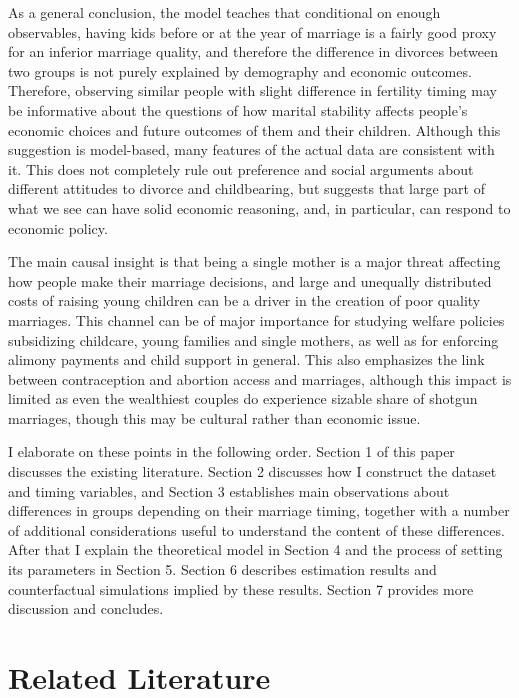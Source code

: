 \documentclass[12pt,letter]{article}
\begin{document}
As a general conclusion, the model teaches that conditional on enough observables, having kids before or at the year of marriage is a fairly good proxy for an inferior marriage quality, and therefore the difference in divorces between two groups is not purely explained by demography and economic outcomes. Therefore, observing similar people with slight difference in fertility timing may be informative about the questions of how marital stability affects people's economic choices and future outcomes of them and their children. Although this suggestion is model-based, many features of the actual data are consistent with it. This does not completely rule out preference and social arguments about different attitudes to divorce and childbearing, but suggests that large part of what we see can have solid economic reasoning, and, in particular, can respond to economic policy. 

The main causal insight is that being a single mother is a major threat affecting how people make their marriage decisions, and large and unequally distributed costs of raising young children can be a driver in the creation of poor quality marriages. This channel can be of major importance for studying welfare policies subsidizing childcare, young families and single mothers, as well as for enforcing alimony payments and child support in general. This also emphasizes the link between contraception and abortion access and marriages, although this impact is limited as even the wealthiest couples do experience sizable share of shotgun marriages, though this may be cultural rather than economic issue.

I elaborate on these points in the following order. Section 1 of this paper discusses the existing literature. Section 2 discusses how I construct the dataset and timing variables, and Section 3 establishes main observations about differences in groups depending on their marriage timing, together with a number of additional considerations useful to understand the content of these differences. After that I explain the theoretical model in Section 4 and the process of setting its parameters in Section 5. Section 6 describes estimation results and counterfactual simulations implied by these results. Section 7 provides more discussion and concludes.

\section{Related Literature}
\end{document}
